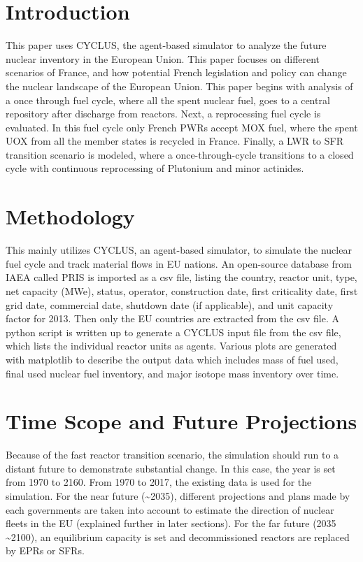 \section{Introduction}
This paper uses CYCLUS, the agent-based simulator \cite{huff_fundamental_2016} to analyze
the future nuclear inventory in the European Union. This paper focuses on different scenarios of France,
and how potential French legislation and policy can change the nuclear landscape of the European
Union. This paper begins with analysis of a once through fuel cycle, where all the spent nuclear fuel,
goes to a central repository after discharge from reactors. Next, a reprocessing fuel cycle is evaluated.
In this fuel cycle only French \gls{PWR}s accept \gls{MOX} fuel, where the spent \gls{UOX} from
all the member states is recycled in France. Finally, a \gls{LWR} to \gls{SFR} transition scenario \cite{wigeland_nuclear_2014}
is modeled,
where a once-through-cycle transitions to a closed cycle with continuous reprocessing of Plutonium and minor actinides.

\section{Methodology}
This mainly utilizes CYCLUS, an agent-based simulator, to simulate the nuclear fuel cycle
and track material flows in EU nations. An open-source database from \gls{IAEA} called
\gls{PRIS} is imported as a csv file, listing the country, reactor unit, type, net capacity (MWe), status,
operator, construction date, first criticality date, first grid date, commercial date, shutdown
date (if applicable), and unit capacity factor for 2013. Then only the EU countries are extracted
from the csv file. A python script is written up to generate a CYCLUS input file from the csv file,
which lists the individual reactor units as agents. Various plots are 
generated with matplotlib to describe the output data which includes mass of fuel used, final used nuclear fuel
inventory, and major isotope mass inventory over time.


\section{Time Scope and Future Projections}
Because of the fast reactor transition scenario, the simulation should run to a distant
future to demonstrate substantial change. In this case, the year is set from
1970 to 2160. From 1970 to 2017, the existing data is used for the simulation.
For the near future (\textasciitilde 2035), different projections and plans
made by each governments are taken
into account to estimate the direction of nuclear fleets in the EU (explained
further in later sections). For the far future (2035 \textasciitilde 2100), an equilibrium capacity
is set and decommissioned reactors are replaced by \gls{EPR}s or \gls{SFR}s.

